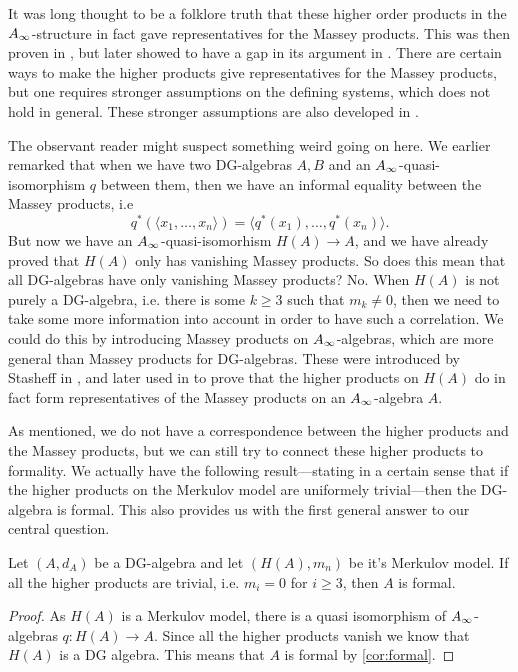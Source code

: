 It was long thought to be a folklore truth that these higher order products in the $A_{\infty}$-structure in fact gave representatives for the Massey products. This was then proven in \cite{Ext}, but later showed to have a gap in its argument in \cite{detection}. There are certain ways to make the higher products give representatives for the Massey products, but one requires stronger assumptions on the defining systems, which does not hold in general. These stronger assumptions are also developed in \cite{detection}. 

\begin{remark}
The observant reader might suspect something weird going on here. We earlier remarked that when we have two DG-algebras $A, B$ and an $A_{\infty}$-quasi-isomorphism $q$ between them, then we have an informal equality between the Massey products, i.e 
\begin{equation*}
	q^*(\langle x_1, \ldots, x_n\rangle ) = \langle q^*(x_1),\ldots, q^*(x_n)\rangle .
\end{equation*}
But now we have an $A_{\infty}$-quasi-isomorhism $H(A)\longrightarrow A$, and we have already proved that $H(A)$ only has vanishing Massey products. So does this mean that all DG-algebras have only vanishing Massey products? No. When $H(A)$ is not purely a DG-algebra, i.e. there is some $k\geq 3$ such that $m_k\neq 0$, then we need to take some more information into account in order to have such a correlation. We could do this by introducing Massey products on $A_{\infty}$-algebras, which are more general than Massey products for DG-algebras. These were introduced by Stasheff in \cite{h-spaces}, and later used in \cite{infty-massey} to prove that the higher products on $H(A)$ do in fact form representatives of the Massey products on an $A_{\infty}$-algebra $A$.
\end{remark}

As mentioned, we do not have a correspondence between the higher products and the Massey products, but we can still try to connect these higher products to formality. We actually have the following result---stating in a certain sense that if the higher products on the Merkulov model are uniformely trivial---then the DG-algebra is formal. This also provides us with the first general answer to our central question.

\begin{theorem}
Let $(A, d_A)$ be a DG-algebra and let $(H(A), m_n)$ be it's Merkulov model. If all the higher products are trivial, i.e. $m_i = 0$ for $i\geq 3$, then $A$ is formal. 
\end{theorem}
\label{thm:formal_iff_no_infty_massey}
\begin{proof}
As $H(A)$ is a Merkulov model, there is a quasi isomorphism of $A_{\infty}$-algebras $q:H(A)\longrightarrow A$. Since all the higher products vanish we know that $H(A)$ is a DG algebra. This means that $A$ is formal by \cref{cor:formal}. 
\end{proof}

